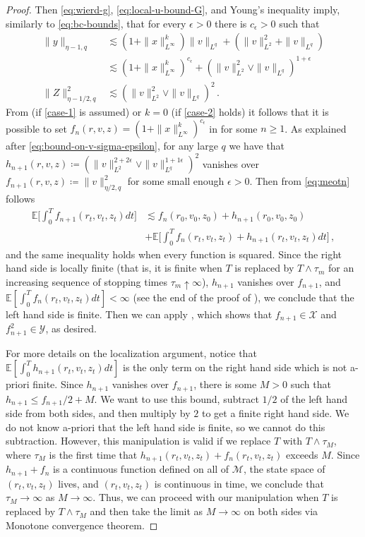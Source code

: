 \documentclass[final]{amsart}
\numberwithin{thm}{section}
\numberwithin{equation}{section}
\newcommand{\E}{\mathbb{E}}
\newcommand{\mcM}{\mathcal{M}}
\newcommand{\X}{\mathcal{X}}
\newcommand{\Y}{\mathcal{Y}}
\begin{document}
\begin{proof}
Then
\eqref{eq:wierd-g}, \eqref{eq:local-u-bound-G}, and Young's inequality imply,  similarly to \eqref{eq:bc-bounds}, that
for every $\epsilon > 0$ there is $c_\epsilon > 0$ such that
    \begin{align*}
        \|y\|_{\eta-1,q} &\lesssim (1 + \|x\|_{L^\infty}^k)\|v\|_{L^q} + (\|v\|_{L^2}^2 + \|v\|_{L^q}) \\
        &\lesssim (1 + \|x\|_{L^\infty}^k)^{c_\epsilon} + (\|v\|_{L^2}^2 \vee \|v\|_{L^q})^{1+\epsilon} \\
        \|Z\|_{\eta-1/2,q}^2
        &\lesssim (\|v\|_{L^2}^2 \vee \|v\|_{L^q})^2 \,.
    \end{align*}
    From  (if  \ref{case-1} is assumed) or $k = 0$ (if \ref{case-2} holds) it follows that 
it is possible to set $f_n(r,v,z) = (1 + \|x\|_{L^\infty}^k)^{c_\epsilon}$ in 
for some $n \geq 1$. 
     As explained after \eqref{eq:bound-on-v-sigma-epsilon}, for any large $q$ we have that $h_{n+1}(r,v,z) \coloneqq (\|v\|_{L^2}^{2+2\epsilon} \vee \|v\|_{L^q}^{1+1\epsilon})^2$ vanishes over $f_{n+1}(r,v,z) \coloneqq \|v\|_{\eta/2,q}^2$ for some small enough $\epsilon > 0$. Then from 
     \eqref{eq:meotn} follows 
    \begin{align*}
        \E\Big[\int_0^T f_{n+1}(r_t,v_t,z_t)dt\Big] &\lesssim f_n(r_0,v_0,z_0) + h_{n+1}(r_0,v_0,z_0) \\
        &+ \E\Big[\int_0^T f_n(r_t,v_t,z_t) + h_{n+1}(r_t,v_t,z_t)dt\Big] \,,
    \end{align*}
    and the same inequality holds when every function is squared. Since the right hand side is locally finite (that is, it is finite when $T$ is replaced by $T \wedge \tau_m$ for an increasing sequence of stopping times $\tau_m \uparrow \infty$), $h_{n+1}$ vanishes over $f_{n+1}$, and $\E[\int_0^Tf_n(r_t,v_t,z_t)dt] < \infty$ (see the end of the proof of ), we conclude that the left hand side is finite. Then we can apply , which shows that $f_{n+1} \in \X$ and $f_{n+1}^2 \in \Y$, as desired.
    
    
    For more details on the localization argument, notice that $\E[\int_0^T h_{n+1}(r_t,v_t,z_t)dt]$ is the only term on the right hand side which is not a-priori finite. Since $h_{n+1}$ vanishes over $f_{n+1}$, there is some $M > 0$ such that $h_{n+1} \leq f_{n+1}/2 + M$. We want to use this bound, subtract $1/2$ of the left hand side from both sides, and then multiply by $2$ to get a finite right hand side. We do not know a-priori that the left hand side is finite, so we cannot do this subtraction. However, this manipulation is valid if we replace $T$ with $T \wedge \tau_M$, where $\tau_M$ is the first time that $h_{n+1}(r_t,v_t,z_t) + f_n(r_t,v_t,z_t)$ exceeds $M$. Since $h_{n+1}+f_n$ is a continuous function defined on all of $\mcM$, the state space of $(r_t,v_t,z_t)$ lives, and $(r_t,v_t,z_t)$ is continuous in time, we conclude that $\tau_M \to \infty$ as $M \to \infty$. Thus, we can proceed with our manipulation when $T$ is replaced by $T \wedge \tau_M$ and then take the limit as $M \to \infty$ on both sides via Monotone convergence theorem.
\end{proof}
\end{document}
